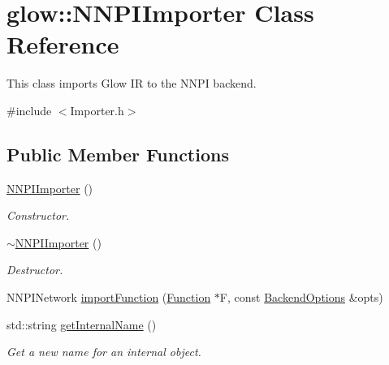\hypertarget{classglow_1_1_n_n_p_i_importer}{}\section{glow\+:\+:N\+N\+P\+I\+Importer Class Reference}
\label{classglow_1_1_n_n_p_i_importer}


This class imports Glow IR to the N\+N\+PI backend.  




{\ttfamily \#include $<$Importer.\+h$>$}

\subsection*{Public Member Functions}
\begin{DoxyCompactItemize}
\item 
\mbox{\label{classglow_1_1_n_n_p_i_importer_a018329f35c8960f6b277bc1e68c78242}} 
\hyperlink{classglow_1_1_n_n_p_i_importer_a018329f35c8960f6b277bc1e68c78242}{N\+N\+P\+I\+Importer} ()
\begin{DoxyCompactList}\small\item\em Constructor. \end{DoxyCompactList}\item 
\mbox{\label{classglow_1_1_n_n_p_i_importer_a373fd8bb5a2d9a4f5dc932b89f70e4dd}} 
\hyperlink{classglow_1_1_n_n_p_i_importer_a373fd8bb5a2d9a4f5dc932b89f70e4dd}{$\sim$\+N\+N\+P\+I\+Importer} ()
\begin{DoxyCompactList}\small\item\em Destructor. \end{DoxyCompactList}\item 
N\+N\+P\+I\+Network \hyperlink{classglow_1_1_n_n_p_i_importer_acee7ca1b564e19778f18da94739bb8f1}{import\+Function} (\hyperlink{classglow_1_1_function}{Function} $\ast$F, const \hyperlink{structglow_1_1_backend_options}{Backend\+Options} \&opts)
\item 
\mbox{\label{classglow_1_1_n_n_p_i_importer_a797ff9c7d339b26dca0da91b0ded1c2d}} 
std\+::string \hyperlink{classglow_1_1_n_n_p_i_importer_a797ff9c7d339b26dca0da91b0ded1c2d}{get\+Internal\+Name} ()
\begin{DoxyCompactList}\small\item\em Get a new name for an internal object. \end{DoxyCompactList}\item 

\end{DoxyCompactItemize}

